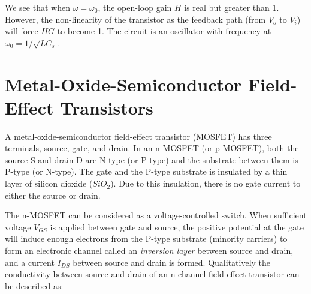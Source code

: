 \begin{itemize}
\begin{comment}
The open-loop gain (from $V_i$ to $V_o$) is:
\[
H=\frac{V_o}{V_i}=\frac{-\omega^2LC_1}{1-\omega^2LC_1+j\omega R(C_1+C_2-\omega^2LC_1C_2)}
\]
At the resonant frequency $\omega_0$, the imaginary part is zero, we have
\[
H=\frac{-\omega^2LC_1}{1-\omega^2LC_1}
=\frac{\omega_0^2LC_1}{\omega_0^2LC_1-1}
=\frac{LC_1/LC_s}{LC_1/LC_s-1}
=\frac{C_1}{C_1-C_s}
=\frac{C_1+C_2}{C_1}
\]
\end{comment}

We see that when $\omega=\omega_0$, the open-loop gain $H$ is real but
greater than 1. However, the non-linearity of the transistor as the 
feedback path (from $V_o$ to $V_i$) will force $HG$ to become 1. The 
circuit is an oscillator with frequency at $\omega_0=1/\sqrt{LC_s}$.

\begin{comment}
http://seit.unsw.adfa.edu.au/staff/sites/hrp/teaching/Electronics4/docs/PLL/colpitts.pdf

http://users.ece.gatech.edu/mleach/ece3050/notes/osc/wienbr.pdf

http://www.ece.msstate.edu/~winton/classes/ece3144/labs/Exp10.pdf

http://www.drp.fmph.uniba.sk/ESM/twin.pdf
\end{comment}


\section*{Metal-Oxide-Semiconductor Field-Effect Transistors}

A metal-oxide-semiconductor field-effect transistor (MOSFET) has three terminals,
source, gate, and drain. In an n-MOSFET (or p-MOSFET), both the source S and drain
D are N-type (or P-type) and the substrate between them is P-type (or N-type). 
The gate and the P-type substrate is insulated by a thin layer of silicon dioxide 
($SiO_2$). Due to this insulation, there is no gate current to either the source or
drain.





The n-MOSFET can be considered as a voltage-controlled switch. When sufficient
voltage $V_{GS}$ is applied between gate and source, the positive potential at 
the gate will induce enough electrons from the P-type substrate (minority 
carriers) to form an electronic channel called an {\em inversion layer} between
source and drain, and a current $I_{DS}$ between source and drain is formed. 
Qualitatively the conductivity between source and drain of an n-channel field 
effect transistor can be described as:


\end{itemize}

